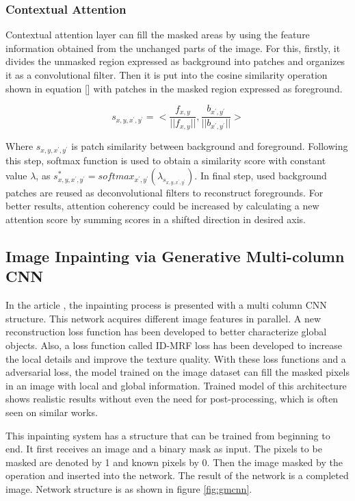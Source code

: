 \newpage
\subsubsection{Contextual Attention}

Contextual attention layer can fill the masked areas by using the feature information obtained from the unchanged parts of the image. For this, firstly, it divides the unmasked region expressed as background into patches and organizes it as a convolutional filter. Then it is put into the cosine similarity operation shown in equation [] with patches in the masked region expressed as foreground.

\begin{equation}
\label{eqn:context}
    s_{x,y,x^{'},y^{'}} = <\frac{f_{x,y}}{||f_{x,y}||}, \frac{b_{x^',y^'}}{||b_{x^{'},y^{'}}||}>
\end{equation}

Where \(s_{x,y,x^{'},y^{'}}\) is patch similarity between background and foreground. Following this step, softmax function is used to obtain a similarity score with constant value \(\lambda\), as \(s^{*}_{x,y,x^{'},y^{'}} = softmax_{x^{'},y^{'} } ( \lambda_{s_{x,y,x^{'},y^{'} } } )\). In final step, used background patches are reused as deconvolutional filters to reconstruct foregrounds. For better results, attention coherency could be increased by calculating a new attention score by summing scores in a shifted direction in desired axis.

\subsection{Image Inpainting via Generative Multi-column CNN}

In the article \cite{inpainting_via_multi_cnn}, the inpainting process is presented with a multi column CNN structure. This network acquires different image features in parallel. A new reconstruction loss function has been developed to better characterize global objects. Also, a loss function called ID-MRF loss has been developed to increase the local details and improve the texture quality. With these loss functions and a adversarial loss, the model trained on the image dataset can fill the masked pixels in an image with local and global information. Trained model of this architecture shows realistic results without even the need for post-processing, which is often seen on similar works.

This inpainting system has a structure that can be trained from beginning to end. It first receives an image and a binary mask as input. The pixels to be masked are denoted by 1 and known pixels by 0. Then the image masked by the  operation and inserted into the network. The result of the network is a completed image. Network structure is as shown in figure \ref{fig:gmcnn}.

